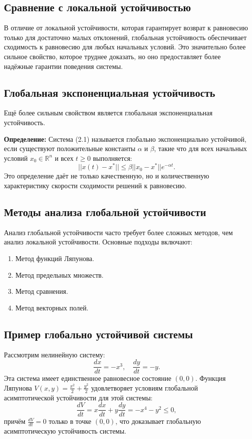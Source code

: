 \documentclass[a4paper,14pt]{extarticle} %
\begin{document}
\subsection{Сравнение с локальной устойчивостью}

В отличие от локальной устойчивости, которая гарантирует возврат к равновесию только для достаточно малых отклонений, глобальная устойчивость обеспечивает сходимость к равновесию для любых начальных условий. Это значительно более сильное свойство, которое труднее доказать, но оно предоставляет более надёжные гарантии поведения системы.

\subsection{Глобальная экспоненциальная устойчивость}

Ещё более сильным свойством является глобальная экспоненциальная устойчивость.

\textbf{Определение:} Система (2.1) называется глобально экспоненциально устойчивой, если существуют положительные константы \(\alpha\) и \(\beta\), такие что для всех начальных условий \(x_0 \in \mathbb{R}^n\) и всех \(t \geq 0\) выполняется:
\[
||x(t) - x^*|| \leq \beta ||x_0 - x^*|| e^{-\alpha t}.
\]
Это определение даёт не только качественную, но и количественную характеристику скорости сходимости решений к равновесию.

\subsection{Методы анализа глобальной устойчивости}

Анализ глобальной устойчивости часто требует более сложных методов, чем анализ локальной устойчивости. Основные подходы включают:
\begin{enumerate}
    \item Метод функций Ляпунова.
    \item Метод предельных множеств.
    \item Метод сравнения.
    \item Метод векторных полей.
\end{enumerate}

\subsection{Пример глобально устойчивой системы}

Рассмотрим нелинейную систему:
\[
\frac{dx}{dt} = -x^3, \quad \frac{dy}{dt} = -y.
\]
Эта система имеет единственное равновесное состояние \((0, 0)\). Функция Ляпунова \(V(x, y) = \frac{x^2}{2} + \frac{y^2}{2}\) удовлетворяет условиям глобальной асимптотической устойчивости для этой системы:
\[
\frac{dV}{dt} = x \frac{dx}{dt} + y \frac{dy}{dt} = -x^4 - y^2 \leq 0,
\]
причём \(\frac{dV}{dt} = 0\) только в точке \((0, 0)\), что доказывает глобальную асимптотическую устойчивость системы.
\end{document}
